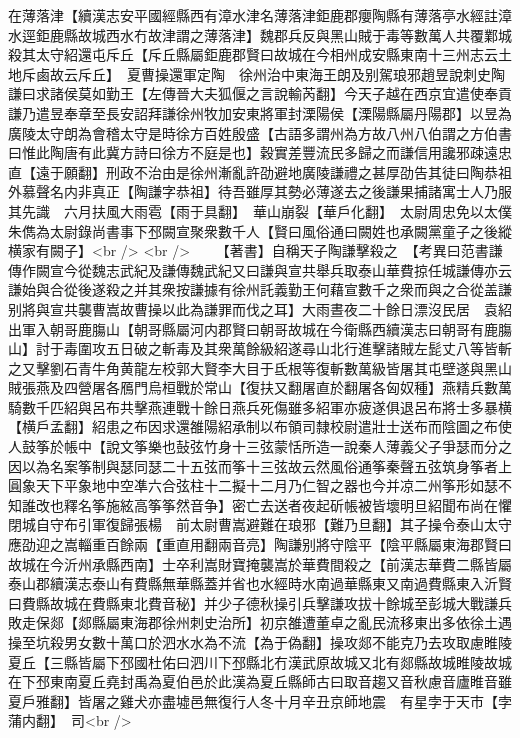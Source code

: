 在薄落津【續漢志安平國經縣西有漳水津名薄落津鉅鹿郡癭陶縣有薄落亭水經註漳水逕鉅鹿縣故城西水冇故津謂之薄落津】魏郡兵反與黑山賊于毒等數萬人共覆鄴城殺其太守紹還屯斥丘【斥丘縣屬鉅鹿郡賢曰故城在今相州成安縣東南十三州志云土地斥鹵故云斥丘】　夏曹操還軍定陶　徐州治中東海王朗及别駕琅邪趙昱說刺史陶謙曰求諸侯莫如勤王【左傳晉大夫狐偃之言說輸芮翻】今天子越在西京宜遣使奉貢謙乃遣昱奉章至長安詔拜謙徐州牧加安東將軍封溧陽侯【溧陽縣屬丹陽郡】以昱為廣陵太守朗為會稽太守是時徐方百姓殷盛【古語多謂州為方故八州八伯謂之方伯書曰惟此陶唐有此冀方詩曰徐方不庭是也】穀實差豐流民多歸之而謙信用讒邪疎遠忠直【遠于願翻】刑政不治由是徐州漸亂許劭避地廣陵謙禮之甚厚劭告其徒曰陶恭祖外慕聲名内非真正【陶謙字恭祖】待吾雖厚其勢必薄遂去之後謙果捕諸寓士人乃服其先識　六月扶風大雨雹【雨于具翻】　華山崩裂【華戶化翻】　太尉周忠免以太僕朱儁為太尉錄尚書事下邳闕宣聚衆數千人【賢曰風俗通曰闕姓也承闕黨童子之後縱横家有闕子】<br />
<br />
　　【著書】自稱天子陶謙擊殺之　【考異曰范書謙傳作闕宣今從魏志武紀及謙傳魏武紀又曰謙與宣共舉兵取泰山華費掠任城謙傳亦云謙始與合從後遂殺之并其衆按謙據有徐州託義勤王何藉宣數千之衆而與之合從盖謙别將與宣共襲曹嵩故曹操以此為謙罪而伐之耳】大雨晝夜二十餘日漂沒民居　袁紹出軍入朝哥鹿膓山【朝哥縣屬河内郡賢曰朝哥故城在今衛縣西續漢志曰朝哥有鹿膓山】討于毒圍攻五日破之斬毒及其衆萬餘級紹遂尋山北行進擊諸賊左髭丈八等皆斬之又擊劉石青牛角黄龍左校郭大賢李大目于氐根等復斬數萬級皆屠其屯壁遂與黑山賊張燕及四營屠各鴈門烏桓戰於常山【復扶又翻屠直於翻屠各匈奴種】燕精兵數萬騎數千匹紹與呂布共擊燕連戰十餘日燕兵死傷雖多紹軍亦疲遂俱退呂布將士多暴横【横戶孟翻】紹患之布因求還雒陽紹承制以布領司隸校尉遣壯士送布而陰圖之布使人鼓筝於帳中【說文筝樂也鼔弦竹身十三弦蒙恬所造一說秦人薄義父子爭瑟而分之因以為名案筝制與瑟同瑟二十五弦而筝十三弦故云然風俗通筝秦聲五弦筑身筝者上圓象天下平象地中空凖六合弦柱十二擬十二月乃仁智之器也今并凉二州筝形如瑟不知誰改也釋名筝施絃高筝筝然音争】密亡去送者夜起斫帳被皆壞明旦紹聞布尚在懼閉城自守布引軍復歸張楊　前太尉曹嵩避難在琅邪【難乃旦翻】其子操令泰山太守應劭迎之嵩輜重百餘兩【重直用翻兩音亮】陶謙别將守陰平【陰平縣屬東海郡賢曰故城在今沂州承縣西南】士卒利嵩財寶掩襲嵩於華費間殺之【前漢志華費二縣皆屬泰山郡續漢志泰山有費縣無華縣蓋并省也水經時水南過華縣東又南過費縣東入沂賢曰費縣故城在費縣東北費音秘】并少子德秋操引兵擊謙攻拔十餘城至彭城大戰謙兵敗走保郯【郯縣屬東海郡徐州刺史治所】初京雒遭董卓之亂民流移東出多依徐土遇操至坑殺男女數十萬口於泗水水為不流【為于偽翻】操攻郯不能克乃去攻取慮睢陵夏丘【三縣皆屬下邳國杜佑曰泗川下邳縣北冇漢武原故城又北有郯縣故城睢陵故城在下邳東南夏丘堯封禹為夏伯邑於此漢為夏丘縣師古曰取音趨又音秋慮音廬睢音雖夏戶雅翻】皆屠之雞犬亦盡墟邑無復行人冬十月辛丑京師地震　有星孛于天市【孛蒲内翻】　司<br />
